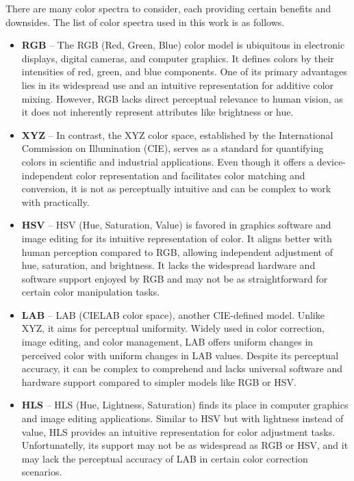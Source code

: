 There are many color spectra to consider, each providing certain benefits and downsides. The list of color spectra used
in this work is as follows.
\begin{itemize}
  \item \textbf{RGB} -- The RGB (Red, Green, Blue) color model is ubiquitous in electronic displays, digital cameras, and computer graphics. It defines colors by their intensities of red, green, and blue components. One of its
  primary advantages lies in its widespread use and an intuitive representation for additive color mixing. However,
  RGB lacks direct perceptual relevance to human vision, as it does not inherently represent attributes like brightness
  or hue.
  \item \textbf{XYZ} -- In contrast, the XYZ color space, established by the International Commission on Illumination
  (CIE), serves as a standard for quantifying colors in scientific and industrial applications. Even though it offers a
  device-independent color representation and facilitates color matching and conversion, it is not as perceptually
  intuitive and can be complex to work with practically.
  \item \textbf{HSV} -- HSV (Hue, Saturation, Value) is favored in graphics software and image editing for its
  intuitive representation of color. It aligns better with human perception compared to RGB, allowing independent
  adjustment of hue, saturation, and brightness. It lacks the widespread hardware and software support enjoyed by RGB
 and may not be as straightforward for certain color manipulation
  tasks.
  \item \textbf{LAB} -- LAB (CIELAB color space), another CIE-defined model. Unlike
  XYZ, it aims for perceptual uniformity. Widely used in color correction, image editing, and color management, LAB
  offers uniform changes in perceived color with uniform changes in LAB values. Despite its perceptual accuracy, it
  can be complex to comprehend and lacks universal software and hardware support compared to simpler models like RGB
  or HSV.
  \item \textbf{HLS} --  HLS (Hue, Lightness, Saturation) finds its place in computer graphics and image editing
  applications. Similar to HSV but with lightness instead of value, HLS provides an intuitive representation for
  color adjustment tasks. Unfortunatelly, its support may not be as widespread as RGB or HSV, and it may lack the
  perceptual accuracy of LAB in certain color correction scenarios.
\end{itemize}

